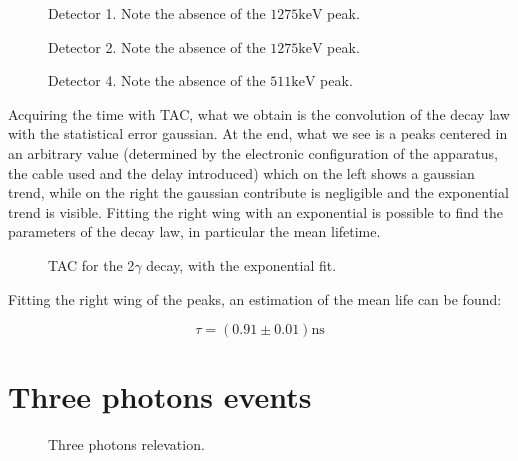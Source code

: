 \documentclass[11pt,a4 paper]{article}
\begin{document}
\begin{figure}[H]
    \centering
    \caption{Detector 1. Note the absence of the $1275\si{\kilo\electronvolt}$ peak.}
    \label{fig:det1:2gamma}
\end{figure}

\begin{figure}[H]
    \centering
    \caption{Detector 2. Note the absence of the $1275\si{\kilo\electronvolt}$ peak.}
    \label{fig:det2:2gamma}
\end{figure}

\begin{figure}[H]
    \centering
    \caption{Detector 4. Note the absence of the $511\si{\kilo\electronvolt}$ peak.}
    \label{fig:det4:2gamma}
\end{figure}

Acquiring the time with TAC, what we obtain is the convolution of the decay law with the statistical error gaussian. At the end, what we see is a peaks centered in an arbitrary value (determined by the electronic configuration of the apparatus, the cable used and the delay introduced) which on the left shows a gaussian trend, while on the right the gaussian contribute is negligible and the exponential trend is visible. Fitting the right wing with an exponential is possible to find the parameters of the decay law, in particular the mean lifetime.

\begin{figure}[H]
    \centering
    \caption{TAC for the 2$\gamma$ decay, with the exponential fit.}
    \label{fig:tac:2gamma}
\end{figure}

Fitting the right wing of the peaks, an estimation of the mean life can be found:

\begin{equation}
    \tau = ( 0.91 \pm 0.01) \si{\nano\second}
\end{equation}

\section{Three photons events}

\begin{figure}[H]
    \centering
     \quad
    \caption{Three photons relevation.}
    \label{fig:rivel120}
\end{figure}
\end{document}
